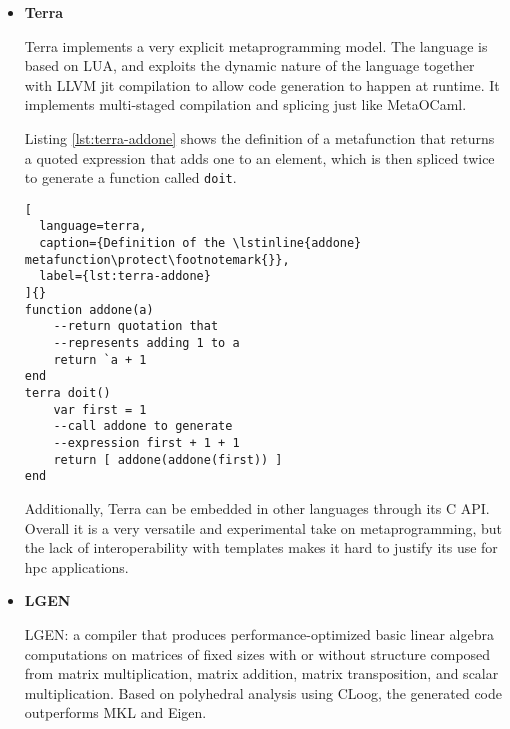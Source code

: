 \documentclass[../main]{subfiles}
\begin{document}
\begin{itemize}
Here we can find an example taken from The Rust Programming Language
book \cite{rust-book} where a simplified version of the \lstinline{vec!} macro,
which initializes a vector and pre-fills it with a static number of values,
is defined:

Listing \ref{lst:rust-vec-macro} shows how the \lstinline{vec!} standard macro
can be defined. Note that the Rust standard library preallocates

\begin{lstlisting}[
  language=rust,
  caption={Definition of the \lstinline{vec!} macro\protect\footnotemark{}},
  label={lst:rust-vec-macro}
]{}
#[macro_export]
macro_rules! vec {
  ( $( $x:expr ),* ) => {
    {
      let mut temp_vec = Vec::new();
      $(
        temp_vec.push($x);
      )*
      temp_vec
    }
  };
}
\end{lstlisting}

\item
\textbf{Terra}

Terra\cite{terra} implements a very explicit metaprogramming model.
The language is based on LUA, and exploits the dynamic nature of the language
together with LLVM \gls{jit} compilation to allow code generation
to happen at runtime.
It implements multi-staged compilation and splicing just like MetaOCaml.

Listing \ref{lst:terra-addone} shows the definition of a metafunction that
returns a quoted expression that adds one to an element, which is then spliced
twice to generate a function called \lstinline{doit}.

\begin{lstlisting}[
  language=terra,
  caption={Definition of the \lstinline{addone} metafunction\protect\footnotemark{}},
  label={lst:terra-addone}
]{}
function addone(a)
    --return quotation that
    --represents adding 1 to a
    return `a + 1
end
terra doit()
    var first = 1
    --call addone to generate
    --expression first + 1 + 1
    return [ addone(addone(first)) ]
end
\end{lstlisting}

Additionally, Terra can be embedded in other languages through its C API.
Overall it is a very versatile and experimental take on metaprogramming,
but the lack of interoperability with \cpp templates makes it hard to justify
its use for \gls{hpc} applications.

\item
\textbf{LGEN}

LGEN\cite{hpcs15}:
a compiler that produces performance-optimized
basic linear algebra computations on matrices
of fixed sizes with or without structure composed
from matrix multiplication, matrix addition, matrix
transposition, and scalar multiplication. Based on
polyhedral analysis using CLoog, the generated code
outperforms MKL and Eigen.

\end{itemize}
\end{document}
